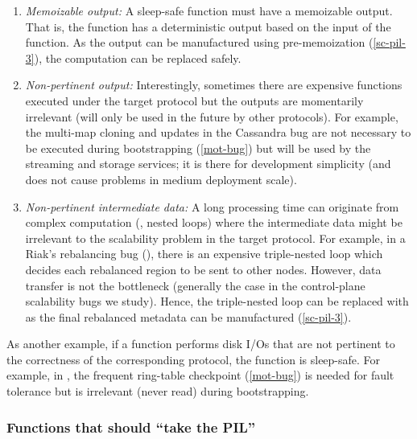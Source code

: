 \begin{enumerate}
\item {\em Memoizable output:} A sleep-safe function must have a
memoizable output.  That is, the function has a deterministic output based
on the input of the function.  As the output can be manufactured using
pre-memoization (\sec\ref{sc-pil-3}), the computation can be replaced
safely.


\item {\em Non-pertinent output:} Interestingly, sometimes there are expensive
functions executed under the target protocol but the outputs are momentarily
irrelevant (will only be used in the future by other protocols).  For example,
the multi-map cloning and updates in the Cassandra bug are not necessary to be
executed during bootstrapping (\sec\ref{mot-bug}) but will be used by the
streaming and storage services; it is there for development simplicity (and
does not cause problems in medium deployment scale).



\item {\em Non-pertinent intermediate data:} A long processing time can
originate from complex computation (\eg, nested  loops) where the
intermediate data might be irrelevant to the scalability problem in the
target protocol.  For example, in a Riak's rebalancing bug (\riakone),
there is an expensive triple-nested loop which decides each rebalanced
region to be sent to other nodes.  However, data transfer is not the
bottleneck (generally the case in the control-plane scalability bugs we
study).  Hence, the triple-nested loop can be replaced with \sleep as the
final rebalanced metadata can be manufactured (\sec\ref{sc-pil-3}).
\end{enumerate}

As another example, if a function performs disk I/Os that are not
pertinent to the correctness of the corresponding protocol, the function
is sleep-safe.  For example, in \caone, the frequent ring-table checkpoint
(\sec\ref{mot-bug}) is needed for fault tolerance but is irrelevant (never
read) during bootstrapping.





\subsubsection{Functions that should ``take the PIL''}
\label{sc-pil-2}

